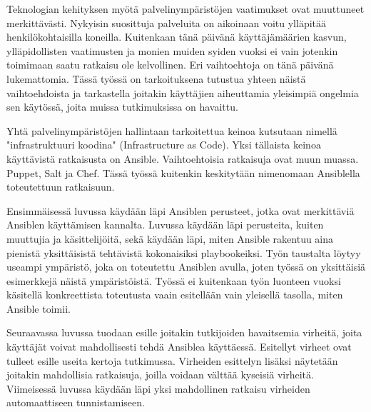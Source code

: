 Teknologian kehityksen myötä palvelinympäristöjen vaatimukset ovat muuttuneet merkittävästi.
Nykyisin suosittuja palveluita on aikoinaan voitu ylläpitää henkilökohtaisilla koneilla.
Kuitenkaan tänä päivänä käyttäjämäärien kasvun, ylläpidollisten vaatimusten ja monien muiden
syiden vuoksi ei vain jotenkin toimimaan saatu ratkaisu ole kelvollinen. Eri vaihtoehtoja on
tänä päivänä lukemattomia. Tässä työssä on tarkoituksena tutustua yhteen näistä vaihtoehdoista
ja tarkastella joitakin käyttäjien aiheuttamia yleisimpiä ongelmia sen käytössä, joita muissa
tutkimuksissa on havaittu.

Yhtä palvelinympäristöjen hallintaan tarkoitettua keinoa kutsutaan nimellä "infrastruktuuri
koodina" (Infrastructure as Code). Yksi tällaista keinoa käyttävistä ratkaisusta on Ansible.
Vaihtoehtoisia ratkaisuja ovat muun muassa. Puppet, Salt ja Chef. Tässä työssä kuitenkin
keskitytään nimenomaan Ansiblella toteutettuun ratkaisuun.

Ensimmäisessä luvussa käydään läpi Ansiblen perusteet, jotka ovat merkittäviä Ansiblen
käyttämisen kannalta. Luvussa käydään läpi perusteita, kuiten muuttujia ja käsittelijöitä,
sekä käydään läpi, miten Ansible rakentuu aina pienistä yksittäisistä tehtävistä kokonaisiksi
playbookeiksi. Työn taustalta löytyy useampi ympäristö, joka on toteutettu Ansiblen avulla,
joten työssä on yksittäisiä esimerkkejä näistä ympäristöistä. Työssä ei kuitenkaan työn
luonteen vuoksi käsitellä konkreettista toteutusta vaain esitellään vain yleisellä tasolla,
miten Ansible toimii.

Seuraavassa luvussa tuodaan esille joitakin tutkijoiden havaitsemia virheitä, joita käyttäjät
voivat mahdollisesti tehdä Ansiblea käyttäessä. Esitellyt virheet ovat tulleet esille useita
kertoja tutkimussa. Virheiden esittelyn lisäksi näytetään joitakin mahdollisia ratkaisuja,
joilla voidaan välttää kyseisiä virheitä. Viimeisessä luvussa käydään läpi yksi mahdollinen
ratkaisu virheiden automaattiseen tunnistamiseen.
